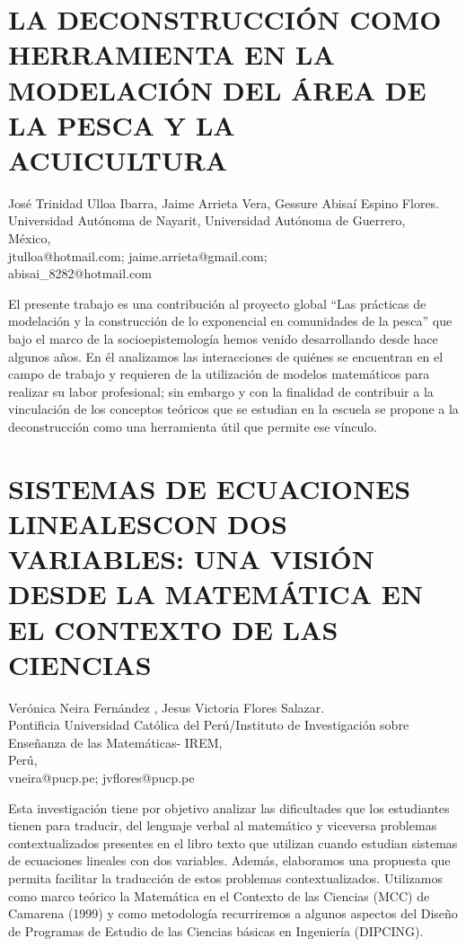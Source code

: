 \section{LA DECONSTRUCCIÓN COMO HERRAMIENTA EN LA MODELACIÓN DEL ÁREA DE LA
PESCA Y LA ACUICULTURA}

\begin{datos}
José Trinidad Ulloa Ibarra, Jaime Arrieta Vera, Gessure Abisaí Espino Flores. \\
Universidad Autónoma de Nayarit, Universidad Autónoma de Guerrero,\\
\hfill México, \\
 \hfill jtulloa@hotmail.com; jaime.arrieta@gmail.com; \\
\hfill abisai\_{}8282@hotmail.com 
\end{datos}

El presente trabajo es una contribución al proyecto global “Las prácticas
de modelación y la construcción de lo exponencial en comunidades de
la pesca” que bajo el marco de la socioepistemología hemos venido
desarrollando desde hace algunos años. En él analizamos las interacciones
de quiénes se encuentran en el campo de trabajo y requieren de la
utilización de modelos matemáticos para realizar su labor profesional;
sin embargo y con la finalidad de contribuir a la vinculación de los
conceptos teóricos que se estudian en la escuela se propone a la deconstrucción
como una herramienta útil que permite ese vínculo.


\section{SISTEMAS DE ECUACIONES LINEALESCON DOS VARIABLES: UNA VISIÓN DESDE
LA MATEMÁTICA EN EL CONTEXTO DE LAS CIENCIAS }

\begin{datos}
Verónica Neira Fernández , Jesus Victoria Flores Salazar. \\
Pontificia Universidad Católica del Perú/Instituto de Investigación sobre Enseñanza de las Matemáticas- IREM,\\
\hfill Perú, \\
 \hfill vneira@pucp.pe; jvflores@pucp.pe 
\end{datos}

Esta investigación tiene por objetivo analizar las dificultades que
los estudiantes tienen para traducir, del lenguaje verbal al matemático
y viceversa problemas contextualizados presentes en el libro texto
que utilizan cuando estudian sistemas de ecuaciones lineales con dos
variables. Además, elaboramos una propuesta que permita facilitar
la traducción de estos problemas contextualizados. Utilizamos como
marco teórico la Matemática en el Contexto de las Ciencias (MCC) de
Camarena (1999) y como metodología recurriremos a algunos aspectos
del Diseño de Programas de Estudio de las Ciencias básicas en Ingeniería
(DIPCING). 


